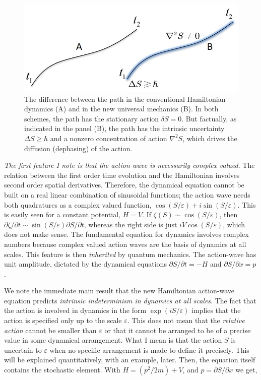 \begin{figure}[H]
\centering
\includegraphics[scale=0.65]{src/images/chap27/2.jpg}
\caption{The difference between the path in the conventional Hamiltonian dynamics (A) and in
the new universal mechanics (B). In both schemes, the path has the stationary action $\delta S = 0$.
But factually, as indicated in the panel (B), the path has the intrinsic uncertainty $\Delta S \geq \hbar$ and a
nonzero concentration of action $\nabla^2 S$, which drives the diffusion (dephasing) of the action.}\label{ch14-fig2}
\end{figure}

\textit{The first feature I note is that the action-wave is necessarily complex valued}. 
The relation between the first order time evolution and the Hamiltonian involves second order spatial
derivatives. Therefore, the dynamical equation cannot be built on a real linear combination of sinusoidal functions; the action wave needs
both quadratures as a complex valued function, $\cos(S/\varepsilon) + i \sin(S/\varepsilon)$. This is easily seen for
a constant potential, $H = V$. If $\zeta(S) \sim \cos (S/\varepsilon)$, 
then $\partial \zeta/\partial t \sim \sin (S/\varepsilon) \partial S/\partial t$, 
whereas the right side is just $iV \cos (S/\varepsilon)$, which does not make sense. The fundamental
equation for dynamics involves complex numbers because complex valued action waves are
the basis of dynamics at all scales. This feature is then \textit{inherited} by quantum mechanics.
The action-wave has unit amplitude, dictated by the dynamical equations $\partial S/\partial t = -H$ and
$\partial S/\partial x = p$.

We note the immediate main result that the new Hamiltonian action-wave equation
predicts \textit{intrinsic indeterminism in dynamics at all scales}. The fact that the action is
involved in dynamics in the form $\exp(iS/\varepsilon)$ implies that the action is specified only up to
the scale $\varepsilon$. This does not mean that the \textit{relative action} cannot be smaller than $\varepsilon$ or that it cannot be
arranged to be of a precise value in some dynamical arrangement. What I mean is that the
action $S$ is uncertain to $\varepsilon$ when no specific arrangement is made to define it precisely. This
will be explained quantitatively, with an example, later. Then, the equation itself contains
the stochastic element. With $H = (p^2 /2m) + V$, and $p = \partial S/\partial x$ we get,

